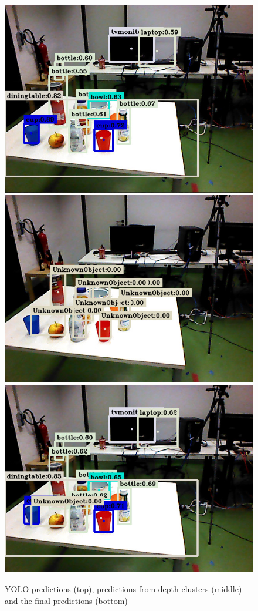 \documentclass[a4paper, twocolumn]{article}
\begin{document}
    \begin{figure}
        \includegraphics[width=\columnwidth]{../img/yolo_table.jpg}
        \includegraphics[width=\columnwidth]{../img/cluster_obj_rgb.jpg}
        \includegraphics[width=\columnwidth]{../img/summary_recognition.jpg}
        \caption{YOLO predictions (top), predictions from depth clusters (middle) and the final predictions (bottom)}
        \label{YOLO_rgb}
        \label{rgb_clust}
        \label{recognition_rgb}
    \end{figure}
\end{document}

